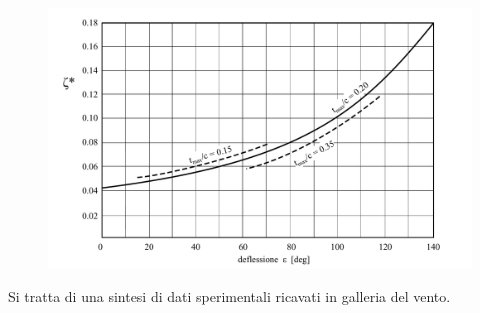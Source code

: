 \begin{figure}
\centering
  \includegraphics[width=\textwidth]{fig/Soderberg.pdf}
\caption{}
\label{fig:Soderberg}
\end{figure}
Si tratta di una sintesi di dati sperimentali ricavati in galleria del vento.

